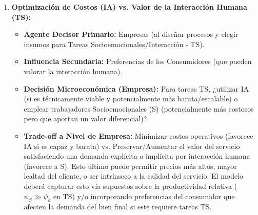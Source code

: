 \documentclass{article}
\theoremstyle{remark}
\theoremstyle{definition}
\begin{document}
\begin{enumerate}
\begin{tcolorbox}[title= Solución Punto 1 (Revisado - Versión Preferida)]
\begin{enumerate}
    \item \textbf{Optimización de Costos (IA) vs. Valor de la Interacción Humana (TS):}
        \begin{itemize}
            \item \textbf{Agente Decisor Primario:} Empresas (al diseñar procesos y elegir insumos para Tareas Socioemocionales/Interacción - TS).
            \item \textbf{Influencia Secundaria:} Preferencias de los Consumidores (que pueden valorar la interacción humana).
            \item \textbf{Decisión Microeconómica (Empresa):} Para tareas TS, ¿utilizar IA (si es técnicamente viable y potencialmente más barata/escalable) o emplear trabajadores Socioemocionales (S) (potencialmente más costosos pero que aportan un valor diferencial)?
            \item \textbf{Trade-off a Nivel de Empresa:} Minimizar costos operativos (favorece IA si es capaz y barata) vs. Preservar/Aumentar el valor del servicio satisfaciendo una demanda explícita o implícita por interacción humana (favorece a S). Esto último puede permitir precios más altos, mayor lealtad del cliente, o ser intrínseco a la calidad del servicio. El modelo deberá capturar esto vía supuestos sobre la productividad relativa ($\psi_S \gg \psi_k$ en TS) y/o incorporando preferencias del consumidor que afecten la demanda del bien final si este requiere tareas TS.
        \end{itemize}
        \vspace{0.5em}


\end{enumerate}
\end{tcolorbox}
\end{enumerate}
\end{document}
